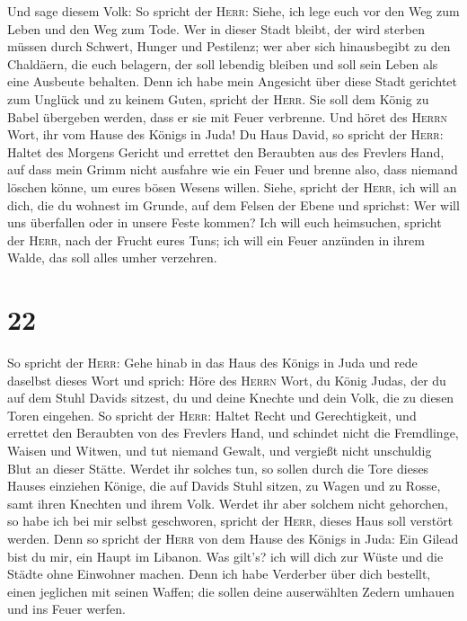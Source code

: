  Und sage diesem Volk: So spricht der \textsc{Herr}:
Siehe, ich lege euch vor den Weg zum Leben und den Weg zum Tode.
 Wer in dieser Stadt bleibt, der wird sterben müssen durch
Schwert, Hunger und Pestilenz; wer aber sich hinausbegibt zu den
Chaldäern, die euch belagern, der soll lebendig bleiben und soll sein
Leben als eine Ausbeute behalten.  Denn ich habe mein
Angesicht über diese Stadt gerichtet zum Unglück und zu keinem Guten,
spricht der \textsc{Herr}. Sie soll dem König zu Babel übergeben werden,
dass er sie mit Feuer verbrenne.  Und höret des
\textsc{Herrn} Wort, ihr vom Hause des Königs in Juda! 
Du Haus David, so spricht der \textsc{Herr}: Haltet des Morgens Gericht
und errettet den Beraubten aus des Frevlers Hand, auf dass mein Grimm
nicht ausfahre wie ein Feuer und brenne also, dass niemand löschen
könne, um eures bösen Wesens willen.  Siehe, spricht der
\textsc{Herr}, ich will an dich, die du wohnest im Grunde, auf dem
Felsen der Ebene und sprichst: Wer will uns überfallen oder in unsere
Feste kommen?  Ich will euch heimsuchen, spricht der
\textsc{Herr}, nach der Frucht eures Tuns; ich will ein Feuer anzünden
in ihrem Walde, das soll alles umher verzehren.

\hypertarget{section-21}{%
\section{22}\label{section-21}}

 So spricht der \textsc{Herr}: Gehe hinab in das Haus des
Königs in Juda und rede daselbst dieses Wort  und sprich:
Höre des \textsc{Herrn} Wort, du König Judas, der du auf dem Stuhl
Davids sitzest, du und deine Knechte und dein Volk, die zu diesen Toren
eingehen.  So spricht der \textsc{Herr}: Haltet Recht und
Gerechtigkeit, und errettet den Beraubten von des Frevlers Hand, und
schindet nicht die Fremdlinge, Waisen und Witwen, und tut niemand
Gewalt, und vergießt nicht unschuldig Blut an dieser Stätte.
 Werdet ihr solches tun, so sollen durch die Tore dieses
Hauses einziehen Könige, die auf Davids Stuhl sitzen, zu Wagen und zu
Rosse, samt ihren Knechten und ihrem Volk.  Werdet ihr
aber solchem nicht gehorchen, so habe ich bei mir selbst geschworen,
spricht der \textsc{Herr}, dieses Haus soll verstört werden.
 Denn so spricht der \textsc{Herr} von dem Hause des
Königs in Juda: Ein Gilead bist du mir, ein Haupt im Libanon. Was
gilt's? ich will dich zur Wüste und die Städte ohne Einwohner machen.
 Denn ich habe Verderber über dich bestellt, einen
jeglichen mit seinen Waffen; die sollen deine auserwählten Zedern
umhauen und ins Feuer werfen.


